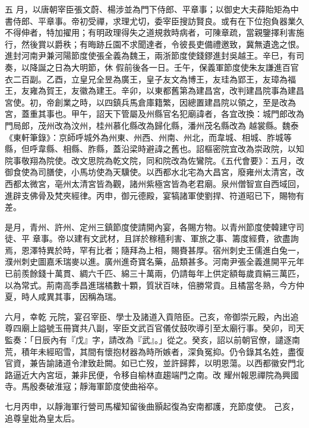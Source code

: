 \begin{pinyinscope}
 五
 月，以唐朝宰臣張文蔚、楊涉並為門下侍郎、平章事；以御史大夫薛貽矩為中書侍郎、平章事。帝初受禪，求理尤切，委宰臣搜訪賢良。或有在下位抱負器業久不得伸者，特加擢用；有明政理得失之道規救時病者，可陳章疏，當親鑒擇利害施行，然後賞以爵秩；有晦跡丘園不求聞達者，令彼長吏備禮邀致，冀無遺逸之恨。進封河南尹兼河陽節度使張全義為魏王，兩浙節度使錢鏐進封吳越王。辛巳，有司奏，以降誕之日為大明節，休
 假前後各一日。壬午，保義軍節度使朱友謙進百官衣二百副。乙酉，立皇兄全昱為廣王，皇子友文為博王，友珪為郢王，友璋為福王，友雍為賀王，友徽為建王。辛卯，以東都舊第為建昌宮，改判建昌院事為建昌宮使。初，帝創業之時，以四鎮兵馬倉庫籍繁，因總置建昌院以領之，至是改為宮，蓋重其事也。甲午，詔天下管屬及州縣官名犯廟諱者，各宜改換：城門郎改為門局郎，茂州改為汶州，桂州慕化縣改為歸化縣，潘州茂名縣改為
 越裳縣。魏泰《東軒筆錄》：京師呼城外為州東、州西、州南、州北，而韋城、相城、胙城等縣，但呼韋縣、相縣、胙縣，蓋沿梁時避諱之舊也。詔樞密院宜改為崇政院，以知院事敬翔為院使。改文思院為乾文院，同和院改為佐鸞院。《五代會要》：五月，改御食使為司膳使，小馬坊使為天驥使。以西都水北宅為大昌宮，廢雍州太清宮，改西都太微宮，亳州太清宮皆為觀，諸州紫極宮皆為老君廟。泉州僧智宣自西域回，進辟支佛骨及梵夾經律。丙申，御元德殿，宴犒諸軍使劉捍、符道昭已下，賜物有差。



 是月，青州、許州、定州三鎮節度使請開內宴，各賜方物。以青州節度使韓建守司徒、平
 章事。帝以建有文武材，且詳於稼穡利害、軍旅之事、籌度經費，欲盡詢焉，恩澤特異於時，罕有比者；隨拜為上相，賜賚甚厚。宿州刺史王儒進白兔一，濮州刺史圖嘉禾瑞麥以進。廣州進奇寶名藥，品類甚多。河南尹張全義進開平元年已前羨餘錢十萬貫、綢六千匹、綿三十萬兩，仍請每年上供定額每歲貢絹三萬匹，以為常式。荊南高季昌進瑞橘數十顆，質狀百味，倍勝常貢。且橘當冬熟，今方仲夏，時人咸異其事，因稱為瑞。



 六月，幸乾
 元院，宴召宰臣、學士及諸道入貢陪臣。己亥，帝御崇元殿，內出追尊四廟上謚號玉冊寶共八副，宰臣文武百官儀仗鼓吹導引至太廟行事。癸卯，司天監奏：「日辰內有『戊』字，請改為『武』。」從之。癸亥，詔以前朝官僚，譴逐南荒，積年未經昭雪，其間有懷抱材器為時所嫉者，深負冤抑。仍令錄其名姓，盡復官資，兼告諭諸道令津致赴闕。如已亡歿，並許歸葬，以明恩蕩。以西都徽安門北路逼近大內宮垣，兼非民便，令移自榆林直趨端門之南。改
 耀州報恩禪院為興國寺。馬殷奏破淮寇；靜海軍節度使曲裕卒。


七月丙申，以靜海軍行營司馬權知留後曲顥起復為安南都護，充節度使。
 己亥，追尊皇妣為皇太后。




\end{pinyinscope}
